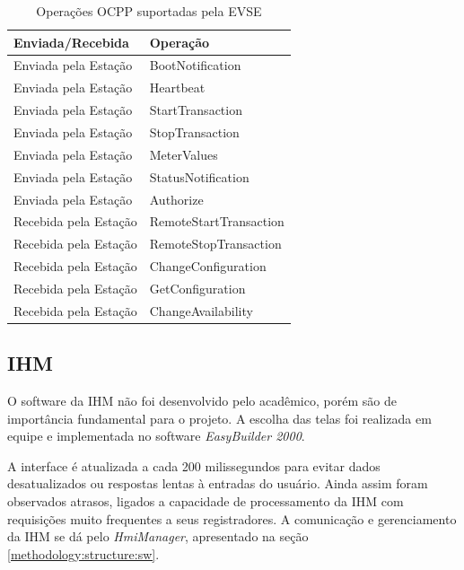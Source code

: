       \begin{table}[]
        \centering
        \caption{Operações OCPP suportadas pela EVSE}
        \label{table:ocpp}
        \begin{tabular}{@{}ll@{}}
          \toprule
          \textbf{Enviada/Recebida} & \textbf{Operação}      \\ \midrule
            Enviada pela Estação      & BootNotification       \\
            Enviada pela Estação      & Heartbeat              \\
            Enviada pela Estação      & StartTransaction       \\
            Enviada pela Estação      & StopTransaction        \\
            Enviada pela Estação      & MeterValues            \\
            Enviada pela Estação      & StatusNotification     \\
            Enviada pela Estação      & Authorize              \\
            Recebida pela Estação     & RemoteStartTransaction \\
            Recebida pela Estação     & RemoteStopTransaction  \\
            Recebida pela Estação     & ChangeConfiguration    \\
            Recebida pela Estação     & GetConfiguration       \\
            Recebida pela Estação     & ChangeAvailability     \\ \bottomrule
        \end{tabular}
      \end{table}

    \subsection{IHM}
    \label{methodology:structure:others}

      O software da \ac{IHM} não foi desenvolvido pelo acadêmico, porém são de importância fundamental para o projeto. A escolha das telas foi realizada em equipe e implementada no software \textit{EasyBuilder 2000}. {}

      A interface é atualizada a cada 200 milissegundos para evitar dados desatualizados ou respostas lentas à entradas do usuário. Ainda assim foram observados atrasos, ligados a capacidade de processamento da \ac{IHM} com requisições muito frequentes a seus registradores. A comunicação e gerenciamento da \ac{IHM} se dá pelo \textit{HmiManager}, apresentado na seção \ref{methodology:structure:sw}.

